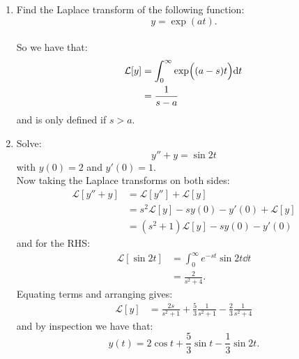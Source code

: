 \documentclass{article}
\begin{document}
\begin{enumerate}
    \item Find the Laplace transform of the following function:
    $$y=\exp\left(at\right).$$ \\

    So we have that:
    \begin{align*}
        \mathcal{L}[y]
        &=\int_{0}^{\infty}\exp\Bigl((a-s)t\Bigr)\dd t \\
        &=\frac{1}{s-a}
    \end{align*}
    and is only defined if $s>a$. \\

    \item Solve:
    $$y''+y=\sin 2t$$
    with $y(0)=2$ and $y'(0)=1$. \\

    Now taking the Laplace transforms on both sides:
    \begin{align*}
        \mathcal{L}[y''+y]
        &=\mathcal{L}[y'']+\mathcal{L}[y] \\
        &=s^2\mathcal{L}[y]-s y(0)-y'(0)+\mathcal{L}[y] \\
        &=(s^2+1)\mathcal{L}[y]-s y(0)-y'(0)
    \end{align*}
    and for the RHS:
    \begin{align*}
        \mathcal{L}[\sin 2t]
        &=\int_{0}^{\infty}e^{-st}
        \sin 2t\dd t \\
        &=\frac{2}{s^2+4}.
    \end{align*}
    Equating terms and arranging gives:
    \begin{align*}
        \mathcal{L}[y]
        &=\frac{2s}{s^2+1}
        +\frac{5}{3}\frac{1}{s^2+1}
        -\frac{2}{3}\frac{1}{s^2+4}
    \end{align*}
    and by inspection we have that:
    $$y(t)=2\cos t+\frac{5}{3}\sin t
    -\frac{1}{3}\sin 2t.$$
\end{enumerate}

\pagestyle{fancy}
\fancyhead{}
\end{document}
